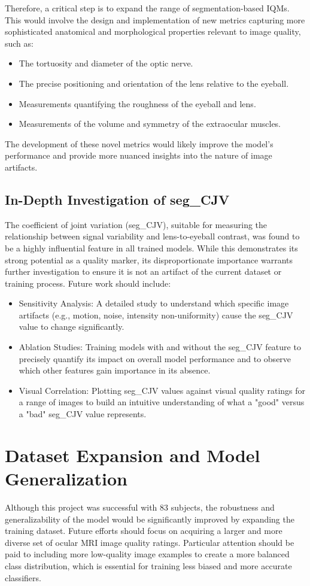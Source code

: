 Therefore, a critical step is to expand the range of segmentation-based IQMs. This would involve the design and implementation of new metrics capturing more sophisticated anatomical and morphological properties relevant to image quality, such as:
\begin{itemize}
    \item The tortuosity and diameter of the optic nerve.
    \item The precise positioning and orientation of the lens relative to the eyeball.
    \item Measurements quantifying the roughness of the eyeball and lens.
    \item Measurements of the volume and symmetry of the extraocular muscles.
\end{itemize}

The development of these novel metrics would likely improve the model's performance and provide more nuanced insights into the nature of image artifacts.

\subsection{In-Depth Investigation of seg\_CJV}

The coefficient of joint variation (seg\_CJV), suitable for measuring the relationship between signal variability and lens-to-eyeball contrast, was found to be a highly influential feature in all trained models. While this demonstrates its strong potential as a quality marker, its disproportionate importance warrants further investigation to ensure it is not an artifact of the current dataset or training process.
Future work should include:
\begin{itemize}
    \item Sensitivity Analysis: A detailed study to understand which specific image artifacts (e.g., motion, noise, intensity non-uniformity) cause the seg\_CJV value to change significantly.
    \item Ablation Studies: Training models with and without the seg\_CJV feature to precisely quantify its impact on overall model performance and to observe which other features gain importance in its absence.
    \item Visual Correlation: Plotting seg\_CJV values against visual quality ratings for a range of images to build an intuitive understanding of what a "good" versus a "bad" seg\_CJV value represents.
\end{itemize}

\section{Dataset Expansion and Model Generalization}
Although this project was successful with 83 subjects, the robustness and generalizability of the model would be significantly improved by expanding the training dataset. Future efforts should focus on acquiring a larger and more diverse set of ocular MRI image quality ratings. Particular attention should be paid to including more low-quality image examples to create a more balanced class distribution, which is essential for training less biased and more accurate classifiers.
